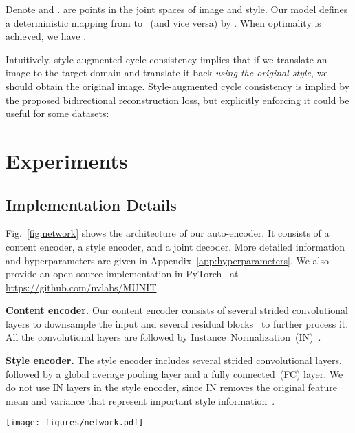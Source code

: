\documentclass[runningheads]{llncs}
\newcommand{\vpara}[1]{\vspace{0.05in}\noindent\textbf{#1}}
\begin{document}
	
	\begin{proposition}
		Denote  and .  are points in the joint spaces of image and style. Our model defines a deterministic mapping  from  to ~(and vice versa) by . When optimality is achieved, we have .
	\end{proposition}
	
	Intuitively, style-augmented cycle consistency implies that if we translate an image to the target domain and translate it back \textit{using the original style}, we should obtain the original image. Style-augmented cycle consistency is implied by the proposed bidirectional reconstruction loss, but explicitly enforcing it could be useful for some datasets:
	

	\section{Experiments}
	\label{sec:experiments}	
	\subsection{Implementation Details}
	\label{sec:implementation}
	Fig.~\ref{fig:network} shows the architecture of our auto-encoder. It consists of a content encoder, a style encoder, and a joint decoder.
	More detailed information and hyperparameters are given in Appendix~\ref{app:hyperparameters}. We also provide an open-source implementation in PyTorch~\cite{paszke2017automatic} at \href{https://github.com/nvlabs/MUNIT}{https://github.com/nvlabs/MUNIT}.
	
	\vpara{Content encoder.} Our content encoder consists of several strided convolutional layers to downsample the input and several residual blocks~\cite{he2016deep} to further process it. All the convolutional layers are followed by \mbox{Instance Normalization~(IN)~\cite{ulyanov2017improved}.}


	\vpara{Style encoder.} The style encoder includes several strided convolutional layers, followed by a global average pooling layer and a fully connected~(FC) layer. We do not use IN layers in the style encoder, since IN removes the original feature mean and variance that represent important style information~\cite{huang2017adain}.

	
	\begin{figure*}[!tb]
		\centering
		\texttt{[image: figures/network.pdf]}
\caption{Our auto-encoder architecture. The content encoder consists of several strided convolutional layers followed by residual blocks. The style encoder contains several strided convolutional layers followed by a global average pooling layer and a fully connected layer. The decoder uses a MLP to produce a set of AdaIN~\cite{huang2017adain} parameters from the style code. The content code is then processed by residual blocks with AdaIN layers, and finally decoded to the image space by upsampling and convolutional layers.} 		
		\label{fig:network}
\end{figure*}
	
\end{document}
